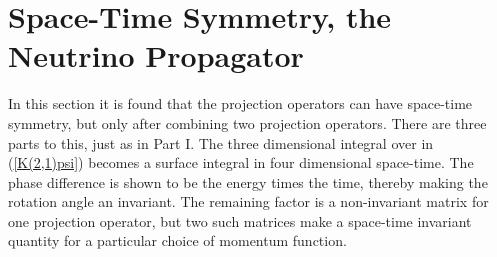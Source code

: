 \documentclass[a4paper,12pt]{article}
\begin{document}
\section{Space-Time Symmetry, the Neutrino Propagator} \label{space-time} %

	In this section it is found that the projection operators can have space-time symmetry, but only after combining two projection operators.  There are three parts to this, just as in Part I. The three dimensional integral over \coordHE{} in (\ref{K(2,1)psi}) becomes a surface integral in four dimensional space-time. The phase difference \myHighlight{$\Delta$}\coordHE{} is shown to be the energy times the time, thereby making the rotation angle an invariant. The remaining factor is a non-invariant matrix for one projection operator, but two such matrices make a space-time invariant quantity for a particular choice of momentum function.
\end{document}
